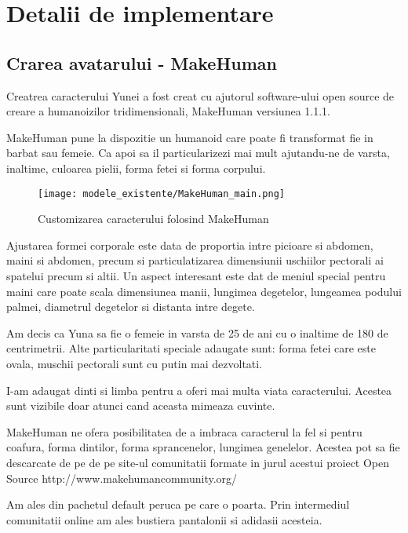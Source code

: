 \documentclass[12pt,a4paper]{report}
\begin{document}
\chapter{Detalii de implementare}

\section{Crarea avatarului - MakeHuman}

Creatrea caracterului Yunei a fost creat cu ajutorul software-ului open source de creare a humanoizilor tridimensionali, MakeHuman versiunea 1.1.1.

MakeHuman pune la dispozitie un humanoid care poate fi transformat fie in barbat sau femeie. Ca apoi sa il particularizezi mai mult ajutandu-ne de varsta, inaltime, culoarea pielii, forma fetei si forma corpului.

\begin{figure}[th]
\centering
\texttt{[image: modele\_existente/MakeHuman\_main.png]}
  \caption[Customizarea caracterului folosind MakeHuman]{Customizarea caracterului folosind MakeHuman\protect\footnotemark}
  \label{figure_1:picture_11}
\end{figure}

Ajustarea formei corporale este data de proportia intre picioare si abdomen, maini si abdomen, precum si particulatizarea dimensiunii uschiilor pectorali ai spatelui precum si altii. Un aspect interesant este dat de meniul special pentru maini care poate scala dimensiunea manii, lungimea degetelor, lungeamea podului palmei, diametrul degetelor si distanta intre degete.

Am decis ca Yuna sa fie o femeie in varsta de 25 de ani cu o inaltime de 180 de centrimetrii. Alte particularitati speciale adaugate sunt: forma fetei care este ovala, muschii pectorali sunt cu putin mai dezvoltati.

I-am adaugat dinti si limba pentru a oferi mai multa viata caracterului. Acestea sunt vizibile doar atunci cand aceasta mimeaza cuvinte.

MakeHuman ne ofera posibilitatea de a imbraca caracterul la fel si pentru coafura, forma dintilor, forma sprancenelor, lungimea genelelor. Acestea pot sa fie descarcate de pe de pe site-ul comunitatii formate in jurul acestui proiect Open Source http://www.makehumancommunity.org/

Am ales din pachetul default peruca pe care o poarta. Prin intermediul comunitatii online am ales bustiera pantalonii si adidasii acesteia.
\end{document}

